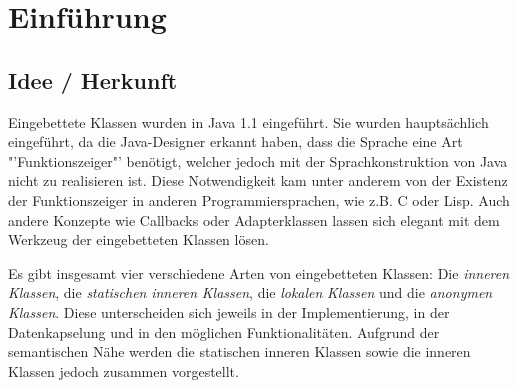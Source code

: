 \chapter{Einführung}
\section{Idee / Herkunft}

Eingebettete Klassen wurden in Java 1.1 eingeführt. \cite{Oracle:JDK_Doku1.1.4}
Sie wurden hauptsächlich eingeführt, da die Java-Designer erkannt haben, dass die Sprache eine Art "'Funktionszeiger"' benötigt, welcher jedoch mit der Sprachkonstruktion von Java nicht zu realisieren ist.
Diese Notwendigkeit kam unter anderem von der Existenz der Funktionszeiger in anderen Programmiersprachen, wie z.B. C oder Lisp.
Auch andere Konzepte wie Callbacks oder Adapterklassen lassen sich elegant mit dem Werkzeug der eingebetteten Klassen lösen.

Es gibt insgesamt vier verschiedene Arten von eingebetteten Klassen: Die {\it inneren} {\it Klassen}, die {\it statischen} {\it inneren} {\it Klassen}, die {\it lokalen} {\it Klassen}
und die {\it anonymen} {\it Klassen}.
Diese unterscheiden sich jeweils in der Implementierung, in der Datenkapselung und in den möglichen Funktionalitäten.
Aufgrund der semantischen Nähe werden die statischen inneren Klassen sowie die inneren Klassen jedoch zusammen vorgestellt.

\newpage
